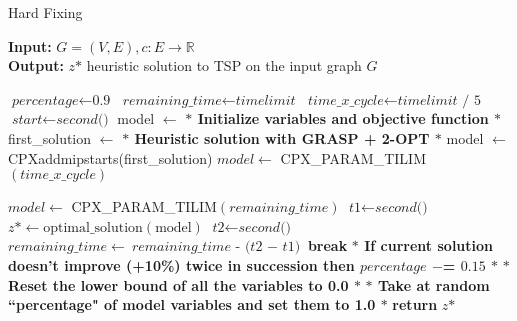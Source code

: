 \begin{algorithm}
    \caption{Hard Fixing}\label{Hard Fixing}
    \hspace*{\algorithmicindent} \textbf{Input:} $G = (V,E) , c : E \rightarrow \mathbb{R}$\\
    \hspace*{\algorithmicindent} \textbf{Output:} $z \text{*} $ heuristic solution to TSP on the input graph $G$
    \begin{algorithmic}[1]
    \State $\textit{percentage} \gets \textit{0.9}$
    \State $\textit{remaining\_time} \gets \textit{timelimit}$
    \State $\textit{time\_x\_cycle} \gets \textit{timelimit / 5}$
    \State $\textit{start} \gets \textit{second()}$
    \State model $ \leftarrow $ \textbf{$\ast$ Initialize variables and objective function $\ast$ }
    \State first\_solution $ \leftarrow $ \textbf{$\ast$ Heuristic solution with GRASP + 2-OPT $\ast$ }
    \State model $ \leftarrow $  CPXaddmipstarts(first\_solution)
	\State $ model \gets $ CPX\_PARAM\_TILIM$(\textit{time\_x\_cycle}) $
	
	\Else \State $ model \gets $ CPX\_PARAM\_TILIM$(\textit{remaining\_time}) $
	\EndIf
	\State $\textit{t1} \gets \textit{second()}$
    	\State $z \text{*} \gets \text{optimal\_solution}(\text{model}) $\;
	\State $\textit{t2} \gets \textit{second()}$
	\State $\textit{remaining\_time} \gets \textit{remaining\_time - (t2 $-$ t1)}$
	\State \textbf{break}
	\EndIf
	\State \textbf{$\ast$ If current solution doesn't improve (+10\%) twice in succession then $ percentage $ $ -$= $ 0.15 $ $\ast$}
	\State \textbf{$\ast$ Reset the lower bound of all the variables to 0.0 $\ast$}
	\State \textbf{$\ast$ Take at random ``percentage" of model variables and set them to 1.0  $\ast$}
    \EndWhile
    \State \textbf{return} $z \text{*} $
    \end{algorithmic}
    \end{algorithm}

